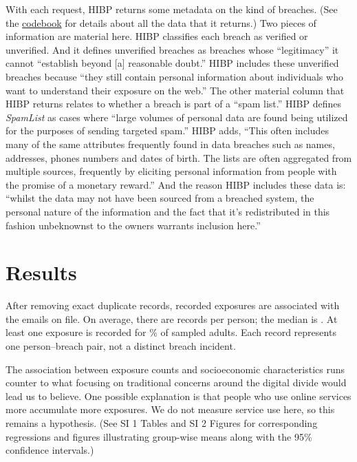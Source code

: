\documentclass[sigconf]{acmart}
\begin{document}
With each request, HIBP returns some metadata on the kind of breaches. (See the \href{https://github.com/themains/pwned_survey/blob/master/data/hibp_codebook.xlsx}{codebook} for details about all the data that it returns.) Two pieces of information are material here. HIBP classifies each breach as verified or unverified. And it defines unverified breaches as breaches whose ``legitimacy'' it cannot ``establish beyond [a] reasonable doubt.'' HIBP includes these unverified breaches because ``they still contain personal information about individuals who want to understand their exposure on the web.'' The other material column that HIBP returns relates to whether a breach is part of a ``spam list.'' HIBP defines {\it SpamList} as cases where ``large volumes of personal data are found being utilized for the purposes of sending targeted spam.'' HIBP adds, ``This often includes many of the same attributes frequently found in data breaches such as names, addresses, phones numbers and dates of birth. The lists are often aggregated from multiple sources, frequently by eliciting personal information from people with the promise of a monetary reward.'' And the reason HIBP includes these data is: ``whilst the data may not have been sourced from a breached system, the personal nature of the information and the fact that it's redistributed in this fashion unbeknownst to the owners warrants inclusion here.''

\section{Results}

After removing \duplicateCount{} exact duplicate records, \eventCount{} recorded exposures are associated with the \sampleSize{} emails on file. On average, there are \meanExposures{} records per person; the median is \medianExposures{}. At least one exposure is recorded for \exposedPercent{}\% of sampled adults. Each record represents one person--breach pair, not a distinct breach incident.

The association between exposure counts and socioeconomic characteristics runs counter to what focusing on traditional concerns around the digital divide would lead us to believe. One possible explanation is that people who use online services more accumulate more exposures. We do not measure service use here, so this remains a hypothesis. (See SI 1 Tables and SI 2 Figures for corresponding regressions and figures illustrating group-wise means along with the 95\% confidence intervals.)
\end{document}
